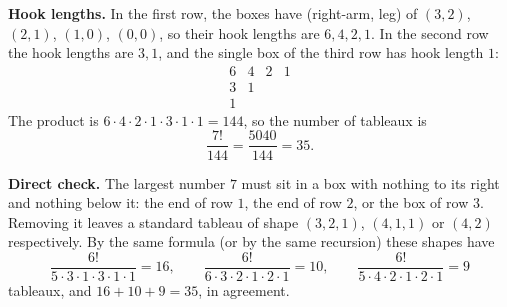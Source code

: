 \textbf{Hook lengths.} In the first row, the boxes have (right-arm, leg) of $(3,2)$, $(2,1)$, $(1,0)$, $(0,0)$, so their hook lengths are $6,4,2,1$. In the second row the hook lengths are $3,1$, and the single box of the third row has hook length $1$:
\[
\begin{array}{cccc}6&4&2&1\\3&1&&\\1&&&\end{array}
\]
The product is $6\cdot4\cdot2\cdot1\cdot3\cdot1\cdot1=144$, so the number of tableaux is
\[
\dfrac{7!}{144}=\dfrac{5040}{144}=\boxed{35}.
\]

\textbf{Direct check.} The largest number $7$ must sit in a box with nothing to its right and nothing below it: the end of row $1$, the end of row $2$, or the box of row $3$. Removing it leaves a standard tableau of shape $(3,2,1)$, $(4,1,1)$ or $(4,2)$ respectively. By the same formula (or by the same recursion) these shapes have
\[
\dfrac{6!}{5\cdot3\cdot1\cdot3\cdot1\cdot1}=16,\qquad\dfrac{6!}{6\cdot3\cdot2\cdot1\cdot2\cdot1}=10,\qquad\dfrac{6!}{5\cdot4\cdot2\cdot1\cdot2\cdot1}=9
\]
tableaux, and $16+10+9=35$, in agreement.
